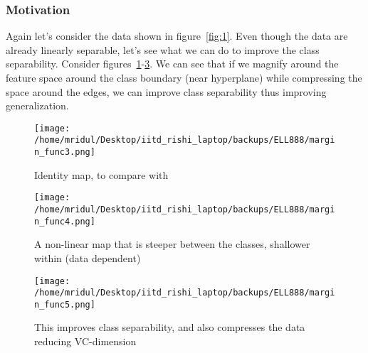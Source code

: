 \documentclass[11pt]{article}
\begin{document}
\subsubsection{Motivation}
Again let's consider the data shown in figure~\ref{fig:1}. Even though the data
are already linearly separable, let's see what we can do to improve the class
separability. Consider figures~\ref{fig:3}-\ref{fig:5}. We can see that if we
magnify around the feature space around the class boundary (near hyperplane)
while compressing the space around the edges, we can improve class separability
thus improving generalization.
\begin{figure}[!htbp]
    \centering
    \texttt{[image: /home/mridul/Desktop/iitd\_rishi\_laptop/backups/ELL888/margin\_func3.png]}
    \caption{\label{fig:3}Identity map, to compare with}
\end{figure}
\begin{figure}[!htbp]
    \centering
    \texttt{[image: /home/mridul/Desktop/iitd\_rishi\_laptop/backups/ELL888/margin\_func4.png]}
    \caption{\label{fig:4}A non-linear map that is steeper between the classes,
    shallower within (data dependent)}
\end{figure}
\begin{figure}[!htbp]
    \centering
    \texttt{[image: /home/mridul/Desktop/iitd\_rishi\_laptop/backups/ELL888/margin\_func5.png]}
    \caption{\label{fig:5}This improves class separability, and also compresses
    the data reducing VC-dimension}
\end{figure}
\end{document}
